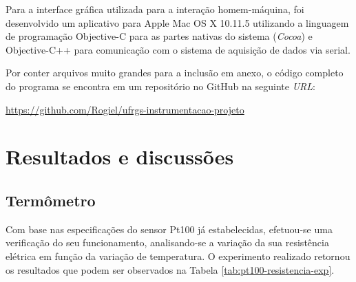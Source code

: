 \documentclass[a4paper]{instrumentacao}
\begin{document}
Para a interface gráfica utilizada para a interação homem-máquina, foi desenvolvido um aplicativo para Apple Mac OS X 10.11.5 utilizando a linguagem de programação Objective-C para as partes nativas do sistema (\textit{Cocoa}) e Objective-C++ para comunicação com o sistema de aquisição de dados via serial.

Por conter arquivos muito grandes para a inclusão em anexo, o código completo do programa se encontra em um repositório no GitHub na seguinte \textit{URL}:

\url{https://github.com/Rogiel/ufrgs-instrumentacao-projeto}

\chapter{Resultados e discussões}

\section{Termômetro}

Com base nas especificações do sensor Pt100 já estabelecidas, efetuou-se uma verificação do seu funcionamento, analisando-se a variação da sua resistência elétrica em função da variação de temperatura. O experimento realizado retornou os resultados que podem ser observados na Tabela \ref{tab:pt100-resistencia-exp}.
\end{document}
